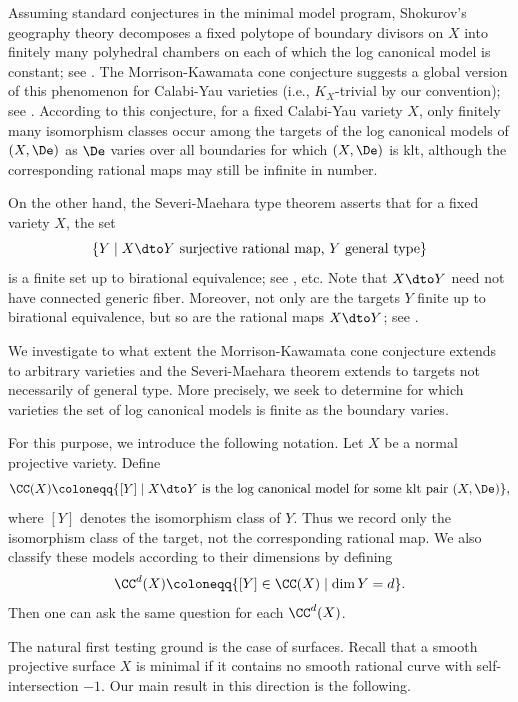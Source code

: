 \documentclass[12pt]{amsart}
\begin{document}

Assuming standard conjectures in the minimal model program,
Shokurov's geography theory decomposes a fixed polytope of boundary
divisors on $X$ into finitely many polyhedral chambers on each of
which the log canonical model is constant; see \cite{SC11}. The Morrison-Kawamata cone conjecture suggests a global version of this phenomenon for Calabi-Yau varieties (i.e., $K_X$-trivial by our convention); see \cite{Mor93,Mor96,Kaw97,Tot10}. According to this conjecture, for a fixed Calabi-Yau variety $X$,
only finitely many isomorphism classes occur among the targets of the
log canonical models of $(X,\De)$ as $\De$ varies over all boundaries
for which $(X,\De)$ is klt, although the corresponding rational maps
may still be infinite in number.

On the other hand, the Severi-Maehara type theorem asserts that for a fixed variety $X$, the set
\[
\{Y \mid X \dto Y \text{~surjective rational map,~} Y \text{~general type}\}
\] is a finite set up to birational equivalence; see \cite{Mae83,Tsa97,BD97,HM06,BJR26}, etc. Note that $X\dto Y$ need not have connected generic fiber. Moreover, not only are the targets $Y$ finite up to birational equivalence, but so are the rational maps $X\dto Y$; see \cite{KO75}.

We investigate to what extent the Morrison-Kawamata cone conjecture extends to arbitrary varieties and the Severi-Maehara theorem extends to targets not necessarily of general type. More precisely, we seek to determine for which varieties the set of log canonical models is finite as the boundary varies.

For this purpose, we introduce the following notation. Let $X$ be a normal projective variety. Define
\[
\CC(X)\coloneqq
\{[Y]\mid X\dto Y \text{~is the log canonical model for some klt pair~}
(X,\De)\},
\]
where $[Y]$ denotes the isomorphism class of $Y$. Thus we record only
the isomorphism class of the target, not the corresponding rational map. We also classify these models according to their dimensions by defining
\[
\CC^d(X)\coloneqq \{[Y] \in \CC(X) \mid \dim Y=d\}.
\] Then one can ask the same question for each $\CC^d(X)$.

The natural first testing ground is the case of surfaces. Recall that a smooth projective surface $X$ is minimal if it contains no smooth rational curve with self-intersection $-1$. Our main result in this direction is the following.
\end{document}
